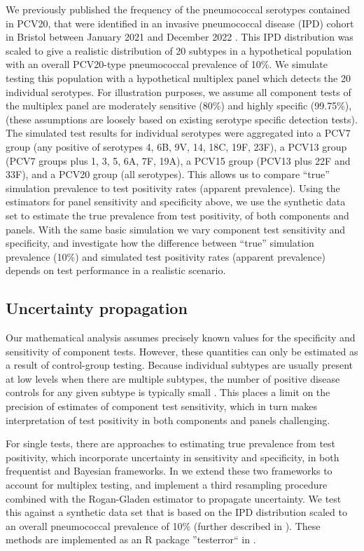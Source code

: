 \documentclass[10pt,letterpaper]{article}
\begin{document}
We previously published the frequency of the pneumococcal serotypes contained in PCV20, that were identified in an invasive pneumococcal disease (IPD) cohort in Bristol between January 2021 and December 2022 \cite{hyams2023}. This IPD distribution was scaled to give a realistic distribution of 20 subtypes in a hypothetical population with an overall PCV20-type pneumococcal prevalence of 10\%. We simulate testing this population with a hypothetical multiplex panel which detects the 20 individual serotypes. For illustration purposes, we assume all component tests of the multiplex panel are moderately sensitive (80\%) and highly specific (99.75\%), (these assumptions are loosely based on existing serotype specific detection tests). The simulated test results for individual serotypes were aggregated into a PCV7 group (any positive of serotypes 4, 6B, 9V, 14, 18C, 19F, 23F), a PCV13 group (PCV7 groups plus 1, 3, 5, 6A, 7F, 19A), a PCV15 group (PCV13 plus 22F and 33F), and a PCV20 group (all serotypes). This allows us to compare ``true'' simulation prevalence to test positivity rates (apparent prevalence). Using the estimators for panel sensitivity and specificity above, we use the synthetic data set to estimate the true prevalence from test positivity, of both components and panels. With the same basic simulation we vary component test sensitivity and specificity, and investigate how the difference between ``true'' simulation prevalence (10\%) and simulated test positivity rates (apparent prevalence) depends on test performance in a realistic scenario.

\subsection*{Uncertainty propagation}

Our mathematical analysis assumes precisely known values for the specificity and sensitivity of component tests. However, these quantities can only be estimated as a result of control-group testing. Because individual subtypes are usually present at low levels when there are multiple subtypes, the number of positive disease controls for any given subtype is typically small \cite{bonten2015}. This places a limit on the precision of estimates of component test sensitivity, which in turn makes interpretation of test positivity in both components and panels challenging.

For single tests, there are approaches to estimating true prevalence from test positivity, which incorporate uncertainty in sensitivity and specificity, in both frequentist\cite{lang2014,thomas2022,flor2020} and Bayesian frameworks\cite{gelman2020,flor2020,diggle2011}. In  we extend these two frameworks to account for multiplex testing, and implement a third resampling procedure combined with the Rogan-Gladen estimator to propagate uncertainty. We test this against a synthetic data set that is based on the IPD distribution scaled to an overall pneumococcal prevalence of 10\% (further described in ). These methods are implemented as an R package ''testerror`` in .
\end{document}
